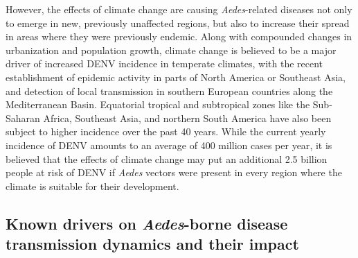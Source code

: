\documentclass[10pt,twocolumn]{wlscirep}
\begin{document}
However, the effects of climate change are causing \textit{Aedes}-related diseases not only to emerge in new, previously unaffected regions, but also to increase their spread in areas where they were previously endemic\cite{quam_2015}. Along with compounded changes in urbanization\cite{lee_2021a} and population growth\cite{struchiner_2015}, climate change is believed to be a major driver of increased DENV incidence in temperate climates\cite{kraemer_2015}, with the recent establishment of epidemic activity in parts of North America\cite{franklinos_2019} or Southeast Asia\cite{ooi_2009}, and detection of local transmission in southern European countries along the Mediterranean Basin\cite{ECDC_2024}. Equatorial tropical and subtropical zones like the Sub-Saharan Africa, Southeast Asia, and northern South America have also been subject to higher incidence over the past 40 years\cite{nakase_2024}. While the current yearly incidence of DENV amounts to an average of 400 million cases per year\cite{pourzangiabadi_2025}, it is believed that the effects of climate change may put an additional 2.5 billion people at risk of DENV if \textit{Aedes} vectors were present in every region where the climate is suitable for their development\cite{nakase_2024}.


\subsection{Known drivers on \textit{Aedes}-borne disease transmission dynamics and their impact} \label{sec-background-aedes-borne-diseases}
\end{document}
